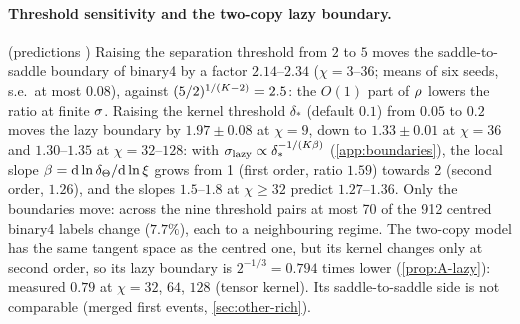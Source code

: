 \paragraph{Threshold sensitivity and the two-copy lazy boundary.}\label{sec:regime-sensitivity}
\empirical{} (predictions \derived) Raising the separation threshold from $2$ to $5$ moves the saddle-to-saddle
boundary of binary4 by a factor $2.14$--$2.34$ ($\chi=3$--$36$; means of six seeds, s.e.\ at most $0.08$), against
$(5/2)^{1/(K-2)}=2.5$: the $O(1)$ part of $\rho_{}$ lowers the ratio at finite $\sigma$. Raising the kernel threshold
$\delta_*$ (default $0.1$) from $0.05$ to $0.2$ moves the lazy boundary by $1.97\pm0.08$ at $\chi=9$, down to $1.33\pm0.01$ at $\chi=36$ and
$1.30$--$1.35$ at $\chi=32$--$128$: with $\sigma_{\rm lazy}\propto\delta_*^{-1/(K\beta)}$ (\cref{app:boundaries}), the local slope
$\beta=\mathrm{d}\ln\delta_{\Theta}/\mathrm{d}\ln\xi$ grows from 1 (first order, ratio $1.59$) towards 2 (second order, $1.26$), and the slopes
$1.5$--$1.8$ at $\chi\ge32$ predict $1.27$--$1.36$. Only the boundaries move: across the nine threshold pairs at most
70 of the 912 centred binary4 labels change ($7.7\%$), each to a neighbouring regime. The two-copy model has the
same tangent space as the centred one, but its kernel changes only at second order, so its lazy boundary is
$2^{-1/3}=0.794$ times lower (\cref{prop:A-lazy}): measured $0.79$ at $\chi=32$, $64$, $128$ (tensor kernel). Its
saddle-to-saddle side is not comparable (merged first events, \cref{sec:other-rich}).


